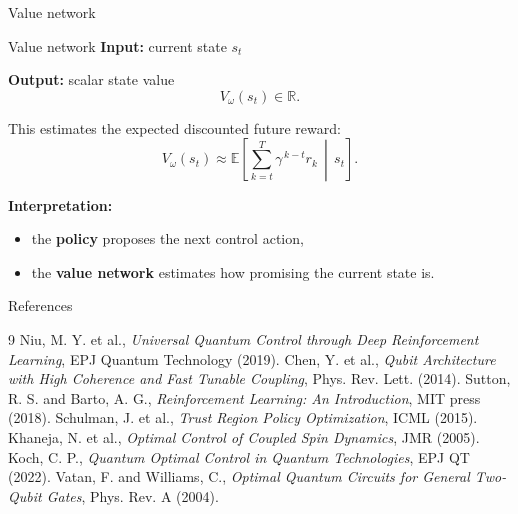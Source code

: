 \documentclass{beamer}
\begin{document}
\begin{frame}{Value network}
    \centering

    \begin{block}{Value network}
    \textbf{Input:} current state \(s_t\)

    \vspace{0.3em}
    \textbf{Output:} scalar state value
    \[
    V_\omega(s_t)\in\mathbb{R}.
    \]

    \vspace{0.3em}
    This estimates the expected discounted future reward:
    \[
    V_\omega(s_t)\approx
    \mathbb{E}\!\left[
    \sum_{k=t}^{T}\gamma^{\,k-t} r_k
    \,\middle|\, s_t
    \right].
    \]

    \vspace{0.4em}
    \textbf{Interpretation:}
    \begin{itemize}
        \item the \textbf{policy} proposes the next control action,
        \item the \textbf{value network} estimates how promising the current state is.
    \end{itemize}
    \end{block}
\let\thefootnote\relax{}
\end{frame}

\begin{frame}[allowframebreaks]{References}
\scriptsize
\begin{thebibliography}{9}
     Niu, M. Y. et al., \emph{Universal Quantum Control through Deep Reinforcement Learning}, EPJ Quantum Technology (2019).
     Chen, Y. et al., \emph{Qubit Architecture with High Coherence and Fast Tunable Coupling}, Phys. Rev. Lett. (2014).
     Sutton, R. S. and Barto, A. G., \emph{Reinforcement Learning: An Introduction}, MIT press (2018).
     Schulman, J. et al., \emph{Trust Region Policy Optimization}, ICML (2015).
     Khaneja, N. et al., \emph{Optimal Control of Coupled Spin Dynamics}, JMR (2005).
     Koch, C. P., \emph{Quantum Optimal Control in Quantum Technologies}, EPJ QT (2022).
     Vatan, F. and Williams, C., \emph{Optimal Quantum Circuits for General Two-Qubit Gates}, Phys. Rev. A (2004).
\end{thebibliography}
\end{frame}
\end{document}
